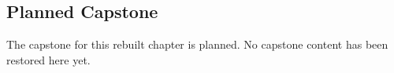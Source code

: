\subsection*{Planned Capstone}

The capstone for this rebuilt chapter is planned. No capstone content has been
restored here yet.
